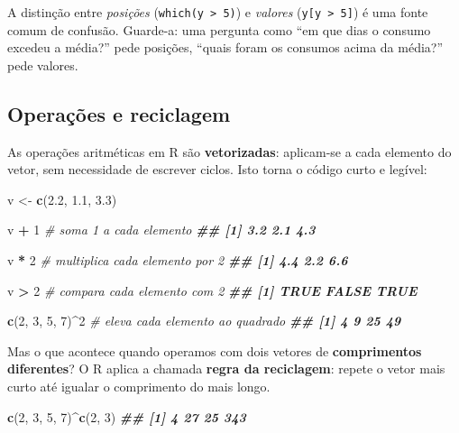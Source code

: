 \documentclass[
  portuguese,
  11pt,
  openany]{book}
\newenvironment{Shaded}{\begin{snugshade}}{\end{snugshade}}
\newcommand{\CommentTok}[1]{\textcolor[rgb]{0.56,0.35,0.01}{\textit{#1}}}
\newcommand{\DecValTok}[1]{\textcolor[rgb]{0.00,0.00,0.81}{#1}}
\newcommand{\DocumentationTok}[1]{\textcolor[rgb]{0.56,0.35,0.01}{\textbf{\textit{#1}}}}
\newcommand{\FloatTok}[1]{\textcolor[rgb]{0.00,0.00,0.81}{#1}}
\newcommand{\FunctionTok}[1]{\textcolor[rgb]{0.13,0.29,0.53}{\textbf{#1}}}
\newcommand{\NormalTok}[1]{#1}
\newcommand{\OtherTok}[1]{\textcolor[rgb]{0.56,0.35,0.01}{#1}}
\newcommand{\SpecialCharTok}[1]{\textcolor[rgb]{0.81,0.36,0.00}{\textbf{#1}}}
\begin{document}
A distinção entre \emph{posições} (\texttt{which(y\ \textgreater{}\ 5)}) e \emph{valores} (\texttt{y{[}y\ \textgreater{}\ 5{]}}) é uma fonte comum de confusão. Guarde-a: uma pergunta como ``em que dias o consumo excedeu a média?'' pede posições, ``quais foram os consumos acima da média?'' pede valores.

\subsection{Operações e reciclagem}\label{operauxe7uxf5es-e-reciclagem}

As operações aritméticas em R são \textbf{vetorizadas}: aplicam-se a cada elemento do vetor, sem necessidade de escrever ciclos. Isto torna o código curto e legível:

\begin{Shaded}
\begin{Highlighting}[]
\NormalTok{v }\OtherTok{\textless{}{-}} \FunctionTok{c}\NormalTok{(}\FloatTok{2.2}\NormalTok{, }\FloatTok{1.1}\NormalTok{, }\FloatTok{3.3}\NormalTok{)}

\NormalTok{v }\SpecialCharTok{+} \DecValTok{1}        \CommentTok{\# soma 1 a cada elemento}
\DocumentationTok{\#\# [1] 3.2 2.1 4.3}

\NormalTok{v }\SpecialCharTok{*} \DecValTok{2}        \CommentTok{\# multiplica cada elemento por 2}
\DocumentationTok{\#\# [1] 4.4 2.2 6.6}

\NormalTok{v }\SpecialCharTok{\textgreater{}} \DecValTok{2}        \CommentTok{\# compara cada elemento com 2}
\DocumentationTok{\#\# [1]  TRUE FALSE  TRUE}

\FunctionTok{c}\NormalTok{(}\DecValTok{2}\NormalTok{, }\DecValTok{3}\NormalTok{, }\DecValTok{5}\NormalTok{, }\DecValTok{7}\NormalTok{)}\SpecialCharTok{\^{}}\DecValTok{2}   \CommentTok{\# eleva cada elemento ao quadrado}
\DocumentationTok{\#\# [1]  4  9 25 49}
\end{Highlighting}
\end{Shaded}

Mas o que acontece quando operamos com dois vetores de \textbf{comprimentos
diferentes}? O R aplica a chamada \textbf{regra da reciclagem}: repete o vetor mais
curto até igualar o comprimento do mais longo.

\begin{Shaded}
\begin{Highlighting}[]
\FunctionTok{c}\NormalTok{(}\DecValTok{2}\NormalTok{, }\DecValTok{3}\NormalTok{, }\DecValTok{5}\NormalTok{, }\DecValTok{7}\NormalTok{)}\SpecialCharTok{\^{}}\FunctionTok{c}\NormalTok{(}\DecValTok{2}\NormalTok{, }\DecValTok{3}\NormalTok{)}
\DocumentationTok{\#\# [1]   4  27  25 343}
\end{Highlighting}
\end{Shaded}
\end{document}
